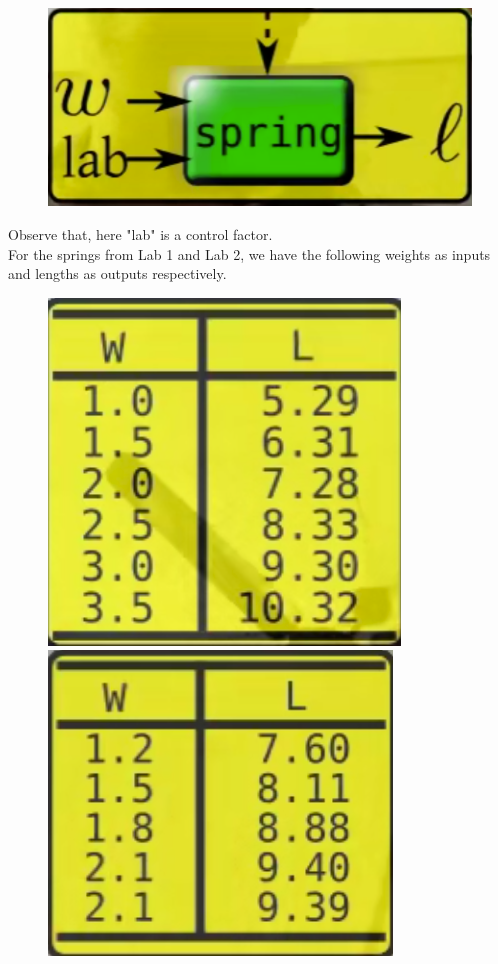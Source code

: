 \documentclass[11pt, a4paper]{article}\usepackage[]{graphicx}\usepackage[]{xcolor}
\begin{document}
\begin{figure}[h]
	\centering
	\includegraphics[scale = 0.5]{Screenshot (1479)}\\
\end{figure}

Observe that, here "lab" is a control factor. \\

For the springs from Lab 1 and Lab 2, we have the following weights as inputs and lengths as outputs respectively. \\
\begin{figure}[h]
	\centering
	\includegraphics[scale = 0.5]{spring_lab_1}
	\hspace{100pt}
	\includegraphics[scale = 0.5]{spring_lab_2}
\end{figure}
\end{document}
